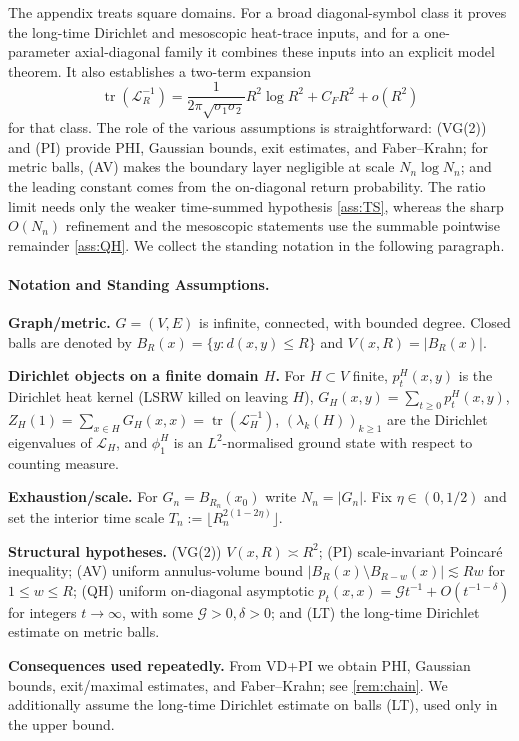 \documentclass[reqno]{amsart}
\numberwithin{equation}{section}
\theoremstyle{definition}
\theoremstyle{remark}
\newcommand{\Cref}[1]{\autoref{#1}}
\newcommand{\cG}{\mathcal{G}}
\DeclareMathOperator{\tr}{tr}
\newcommand{\LL}{\mathcal{L}}
\begin{document}
The appendix treats square domains. For a broad diagonal-symbol class it proves the long-time Dirichlet and mesoscopic heat-trace inputs, and for a one-parameter axial-diagonal family it combines these inputs into an explicit model theorem. It also establishes a two-term expansion
\[
  \tr(\mathcal L_R^{-1})
  =
  \frac{1}{2\pi\sqrt{\sigma_1\sigma_2}}R^2\log R^2
  + C_F R^2
  + o(R^2)
\]
for that class. The role of the various assumptions is straightforward: \textup{(VG(2))} and \textup{(PI)} provide PHI, Gaussian bounds, exit estimates, and Faber--Krahn; for metric balls, \textup{(AV)} makes the boundary layer negligible at scale $N_n\log N_n$; and the leading constant comes from the on-diagonal return probability. The ratio limit needs only the weaker time-summed hypothesis \Cref{ass:TS}, whereas the sharp $O(N_n)$ refinement and the mesoscopic statements use the summable pointwise remainder \Cref{ass:QH}. We collect the standing notation in the following paragraph.

\paragraph{Notation and Standing Assumptions.}
\noindent\textbf{Graph/metric.} $G=(V,E)$ is infinite, connected, with bounded degree. Closed balls are denoted by $B_R(x)=\{y:d(x,y)\le R\}$ and $V(x,R)=|B_R(x)|$.

\noindent\textbf{Dirichlet objects on a finite domain $H$.} For $H\subset V$ finite, $p_t^{H}(x,y)$ is the Dirichlet heat kernel (LSRW killed on leaving $H$), $G_H(x,y)=\sum_{t\ge0} p_t^{H}(x,y)$, $Z_H(1)=\sum_{x\in H} G_H(x,x)=\tr(\LL_H^{-1})$, $(\lambda_k(H))_{k\ge1}$ are the Dirichlet eigenvalues of $\LL_H$, and $\phi_1^{H}$ is an $L^2$-normalised ground state with respect to counting measure.

\noindent\textbf{Exhaustion/scale.} For $G_n=B_{R_n}(x_0)$ write $N_n=|G_n|$. Fix $\eta\in(0,1/2)$ and set the interior time scale $T_n:=\lfloor R_n^{2(1-2\eta)}\rfloor$.

\noindent\textbf{Structural hypotheses.} (VG(2)) $V(x,R)\asymp R^2$; (PI) scale-invariant Poincar\'e inequality; (AV) uniform annulus-volume bound $|B_R(x)\setminus B_{R-w}(x)|\lesssim Rw$ for $1\le w\le R$; (QH) uniform on-diagonal asymptotic $p_t(x,x)=\cG t^{-1}+O(t^{-1-\delta})$ for integers $t\to\infty$, with some $\cG>0,\delta>0$; and (LT) the long-time Dirichlet estimate on metric balls.

\noindent\textbf{Consequences used repeatedly.} From VD+PI we obtain PHI, Gaussian bounds, exit/maximal estimates, and Faber--Krahn; see \Cref{rem:chain}. We additionally assume the long-time Dirichlet estimate on balls (LT), used only in the upper bound.
\end{document}
